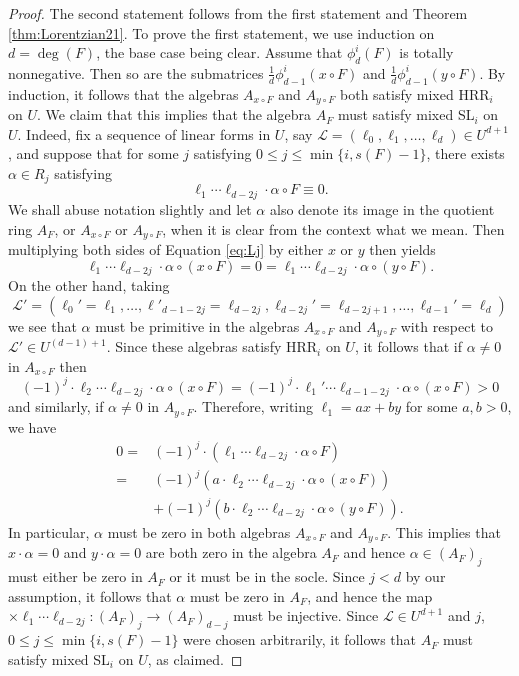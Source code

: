 \documentclass[unnumsec,webpdf,modern,medium]{oup-authoring-template}
\theoremstyle{theorem}
\theoremstyle{definition}
\begin{document}
\begin{proof}
	The second statement follows from the first statement and Theorem \ref{thm:Lorentzian21}.
	To prove the first statement, we use induction on $d=\deg(F)$, the base case being clear.  Assume that $\phi^i_d(F)$ is totally nonnegative.  Then so are the submatrices $\frac{1}{d}\phi^i_{d-1}\left(x\circ F\right)$ and $\frac{1}{d}\phi^i_{d-1}\left(y\circ F\right)$.  By induction, it follows that the algebras $A_{x\circ F}$ and $A_{y\circ F}$ both satisfy mixed HRR$_i$ on $U$.  We claim that this implies that the algebra $A_F$ must satisfy mixed SL$_i$ on $U$.  Indeed, fix a sequence of linear forms in $U$, say $\mathcal{L}=(\ell_0,\ell_1,\ldots,\ell_d)\in U^{d+1}$, and suppose that for some $j$ satisfying $0\leq j\leq \min\{i,s(F)-1\}$, there exists $\alpha\in R_j$ satisfying 
	\begin{equation}
		\label{eq:Lj}
		\ell_1\cdots\ell_{d-2j}\cdot\alpha\circ F\equiv 0.
	\end{equation}
	We shall abuse notation slightly and let $\alpha$ also denote its image in the quotient ring $A_F$, or $A_{x\circ F}$ or $A_{y\circ F}$, when it is clear from the context what we mean.  
	Then multiplying both sides of Equation \eqref{eq:Lj} by either $x$ or $y$ then yields 
	$$\ell_1\cdots\ell_{d-2j}\cdot\alpha\circ\left(x\circ F\right)=0=\ell_1\cdots\ell_{d-2j}\cdot \alpha\circ\left(y\circ F\right).$$
	On the other hand, taking $$\mathcal{L}'=(\ell_0'=\ell_1,\ldots,\ell'_{d-1-2j}=\ell_{d-2j},\ell_{d-2j}'=\ell_{d-2j+1},\ldots,\ell_{d-1}'=\ell_d)$$
	we see that $\alpha$ must be primitive in the algebras $A_{x\circ F}$ and $A_{y\circ F}$ with respect to $\mathcal{L}'\in U^{(d-1)+1}$.  Since these algebras satisfy HRR$_i$ on $U$, it follows that if $\alpha\neq 0$ in $A_{x\circ F}$ then
	$$(-1)^j\cdot \ell_2\cdots\ell_{d-2j}\cdot\alpha\circ\left(x\circ F\right)=(-1)^j\cdot \ell_1'\cdots\ell_{d-1-2j}\cdot\alpha\circ\left(x\circ F\right)>0$$
	and similarly, if $\alpha\neq 0$ in $A_{y\circ F}$.  Therefore, writing $\ell_1=ax+by$ for some $a,b>0$, we have 
	\begin{align*}
		0= & (-1)^j\cdot \left(\ell_1\cdots\ell_{d-2j}\cdot\alpha\circ F\right)\\
		= &  (-1)^j\left(a\cdot \ell_2\cdots\ell_{d-2j}\cdot\alpha\circ \left(x\circ F\right)\right)\\
		& +(-1)^j\left(b\cdot \ell_2\cdots\ell_{d-2j}\cdot\alpha\circ\left(y\circ F\right)\right).
	\end{align*}
	In particular, $\alpha$ must be zero in both algebras $A_{x\circ F}$ and $A_{y\circ F}$.  This implies that $x\cdot \alpha=0$ and $y\cdot\alpha=0$ are both zero in the algebra $A_F$ and hence $\alpha\in \left(A_F\right)_j$ must either be zero in $A_F$ or it must be in the socle.  Since $j<d$ by our assumption, it follows that $\alpha$ must be zero in $A_F$, and hence the map $\times\ell_1\cdots\ell_{d-2j}\colon \left(A_F\right)_j\rightarrow\left(A_F\right)_{d-j}$ must be injective.  Since $\mathcal{L}\in U^{d+1}$ and $j$, $0\leq j\leq \min\{i,s(F)-1\}$ were chosen arbitrarily, it follows that $A_F$ must satisfy mixed SL$_i$ on $U$, as claimed.  
	

\end{proof}
\end{document}
